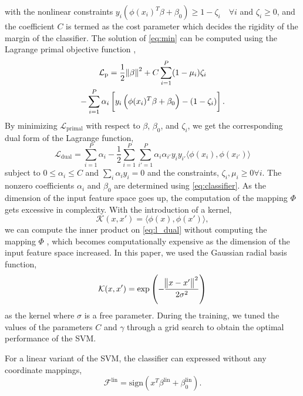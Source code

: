 \documentclass[journal,comsoc]{IEEEtran}
\renewcommand{\^}{\hat}  %
\begin{document}
%
with the nonlinear constraints $y_i (\phi(x_i)^T \beta + \beta_0) \ge 1 - \zeta_i \quad \forall i $ and $ \zeta_i \ge 0$, and the coefficient $C$ is termed as the cost parameter which decides the rigidity of the margin of the classifier. The solution of \eqref{eq:min} can be computed using the Lagrange primal objective function \cite{friedman2001elements},
%
\begin{multline}
  \mathcal L_{\mathrm{p}} = \dfrac{1}{2} \norm{\beta}^2 + C \sum \limits_{i =1}^{P} (1 - \mu_i)\zeta_i \\
  - \sum \limits_{i =1}^{P} \alpha_i \left[ y_i \left( \phi(x_i)^T \beta + \beta_0 \right) - (1 - \zeta_i) \right].
  \label{eq:l_primal}
\end{multline}
%
By minimizing $\mathcal L_{\mathrm{primal}}$ with respect to $\beta$, $\beta_0$, and $\zeta_i$, we get the corresponding dual form of the Lagrange function,
%
\begin{equation}
  \mathcal L_{\mathrm{dual}} = \sum \limits_{i = 1}^{P} \alpha_i - \frac{1}{2} \sum \limits_{i = 1}^{P} \sum_{i' = 1}^{P} \alpha_i \alpha_{i'} y_i y_{i'} \langle \phi(x_i), \phi(x_{i'}) \rangle
  \label{eq:l_dual}
\end{equation}
%
subject to $0 \le \alpha_i \le C$ and $\sum_{i} \alpha_i y_i = 0$ and the constraints, $\zeta_i, \mu_i \ge 0 \forall i$. The nonzero coefficients $\alpha_i$ and $\beta_0$ are determined using \eqref{eq:classifier}. As the dimension of the input feature space goes up, the computation of the mapping $\Phi$ gets excessive in complexity. With the introduction of a kernel,
%
\begin{equation}
  \mathcal K(x,x') = \langle \phi(x), \phi(x') \rangle,
  \label{eq:kernel}
\end{equation}
%
we can compute the inner product on \eqref{eq:l_dual} without  computing the mapping $\Phi$ \cite{scholkopf2002learning}, which becomes computationally expensive as the dimension of the input feature space increased. In this paper, we used the Gaussian radial basis function,
%
\begin{equation}
  \mathcal K(x,x') = \exp {\left(- \frac{\norm{x -x'}^2}{2\sigma^2}\right)}
  \label{eq:rbf}
\end{equation}
%
as the kernel where $\sigma$ is a free parameter. During the training, we tuned the values of the parameters $C$ and $\gamma$ through a grid search to obtain the optimal performance of the SVM.

For a linear variant of the SVM, the classifier can expressed without any coordinate mappings,
%
\begin{equation}
    \mathcal F^{\mathrm{lin}} = \mathrm{sign} \left( x^T \beta^{\mathrm{lin}} + \beta^{\mathrm{lin}}_0 \right).
    \label{eq:lin_classifier}
\end{equation}
%
\end{document}

